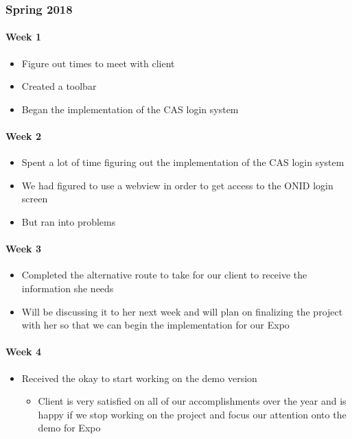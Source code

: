 \documentclass[onecolumn, draftclsnofoot,10pt, compsoc]{IEEEtran}
\begin{document}
    \subsubsection{Spring 2018}
      \paragraph{Week 1}
        \begin{itemize}
          \item Figure out times to meet with client
          \item Created a toolbar
          \item Began the implementation of the CAS login system
        \end{itemize}

      \paragraph{Week 2}
        \begin{itemize}
          \item Spent a lot of time figuring out the implementation of the CAS login system
          \item We had figured to use a webview in order to get access to the ONID login screen
          \item But ran into problems
        \end{itemize}

      \paragraph{Week 3}
        \begin{itemize}
          \item Completed the alternative route to take for our client to receive the information she needs
          \item Will be discussing it to her next week and will plan on finalizing the project with her so that we can begin the implementation for our Expo
        \end{itemize}

      \paragraph{Week 4}
        \begin{itemize}
          \item Received the okay to start working on the demo version
          \begin{itemize}
            \item Client is very satisfied on all of our accomplishments over the year and is happy if we stop working on the project and focus our attention onto the demo for Expo
          \end{itemize}
        \end{itemize}
\end{document}
